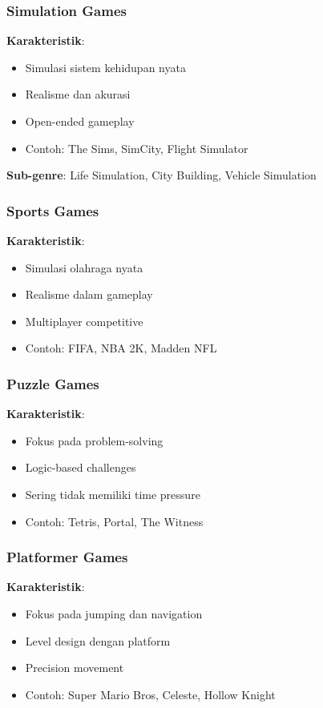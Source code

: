 \subsubsection{Simulation Games}

\textbf{Karakteristik}:
\begin{itemize}
\item Simulasi sistem kehidupan nyata
\item Realisme dan akurasi
\item Open-ended gameplay
\item Contoh: The Sims, SimCity, Flight Simulator
\end{itemize}

\textbf{Sub-genre}: Life Simulation, City Building, Vehicle Simulation

\subsubsection{Sports Games}

\textbf{Karakteristik}:
\begin{itemize}
\item Simulasi olahraga nyata
\item Realisme dalam gameplay
\item Multiplayer competitive
\item Contoh: FIFA, NBA 2K, Madden NFL
\end{itemize}

\subsubsection{Puzzle Games}

\textbf{Karakteristik}:
\begin{itemize}
\item Fokus pada problem-solving
\item Logic-based challenges
\item Sering tidak memiliki time pressure
\item Contoh: Tetris, Portal, The Witness
\end{itemize}

\subsubsection{Platformer Games}

\textbf{Karakteristik}:
\begin{itemize}
\item Fokus pada jumping dan navigation
\item Level design dengan platform
\item Precision movement
\item Contoh: Super Mario Bros, Celeste, Hollow Knight
\end{itemize}



